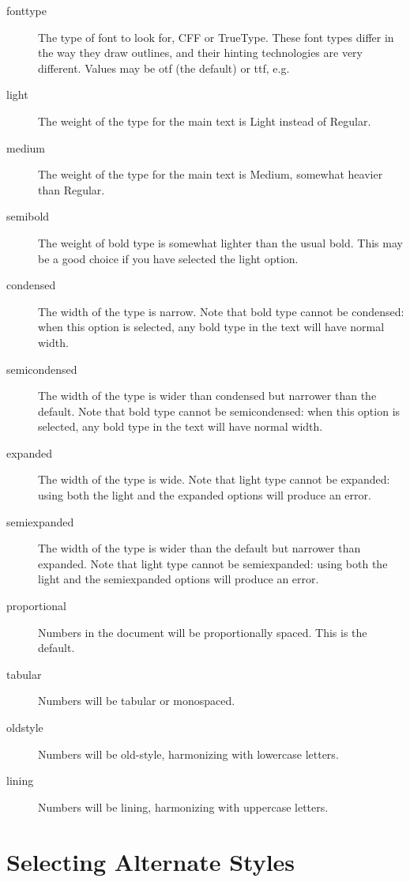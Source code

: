 \documentclass{article}
\begin{document}
\begin{description}
\item[fonttype] The type of font to look for, CFF or TrueType. These font types differ in the
way they draw outlines, and their hinting technologies are very different. Values may be otf
(the default) or ttf, e.g.\\
\hspace*{1in}{\small\verb|\usepackage[fonttype=ttf]{Junicode}|}
\item[light] The weight of the type for the main text is Light instead of Regular.
\item[medium] The weight of the type for the main text is Medium, somewhat heavier than Regular.
\item[semibold] The weight of bold type is somewhat lighter than the usual bold. This may be a
good choice if you have selected the light option.
\item[condensed] The width of the type is narrow. Note that bold type cannot be condensed: when
this option is selected, any bold type in the text will have normal width.
\item[semicondensed] The width of the type is wider than condensed but narrower than the default.
Note that bold type cannot be semicondensed: when this option is selected, any bold type in the
text will have normal width.
\item[expanded] The width of the type is wide. Note that light type cannot be expanded: using
both the light and the expanded options will produce an error.
\item[semiexpanded] The width of the type is wider than the default but narrower than expanded.
Note that light type cannot be semiexpanded: using both the light and the semiexpanded options
will produce an error.
\item[proportional] Numbers in the document will be proportionally spaced. This is the default.
\item[tabular] Numbers will be tabular or monospaced.
\item[oldstyle] Numbers will be old-style, harmonizing with lowercase letters.
\item[lining] Numbers will be lining, harmonizing with uppercase letters.
\end{description}

\section{Selecting Alternate Styles}
\end{document}
